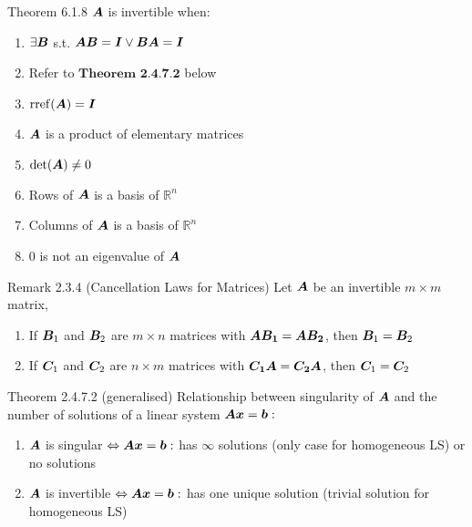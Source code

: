 \documentclass[10pt,portrait]{article}
\begin{document}
\begin{multicols}{2}
\begin{justifying}
\begin{namedthm*}{Theorem 6.1.8}
	\(\bm{A}\) is invertible when:
	\begin{enumerate}
		\item \(\exists \bm{B}\) s.t. \(\bm{AB} = \bm{I} \lor \bm{BA} = \bm{I}\)
		\item Refer to \(\textbf{Theorem 2.4.7.2}\) below
		\item \(\operatorname{rref}(\bm{A}) = \bm{I}\)
		\item \(\bm{A}\) is a product of elementary matrices
		\item \(\det(\bm{A}) \ne 0\)
		\item Rows of \(\bm{A}\) is a basis of \(\mathbb{R}^n\)
		\item Columns of \(\bm{A}\) is a basis of \(\mathbb{R}^n\)
		\item 0 is not an eigenvalue of \(\bm{A}\)
	\end{enumerate} 
\end{namedthm*}

\begin{namedthm*}{Remark 2.3.4 (Cancellation Laws for Matrices)}
	Let \(\bm{A}\) be an invertible \(m \times m\) matrix,
	\begin{enumerate}[label=(\alph*)]
		\item If \(\bm{B}_1\) and \(\bm{B}_2\) are \(m \times n\) matrices with \(\bm{AB_1} = \bm{AB_2}\), then \(\bm{B}_1 = \bm{B}_2\)
		\item If \(\bm{C}_1\) and \(\bm{C}_2\) are \(n \times m\) matrices with \(\bm{C_1A} = \bm{C_2A}\), then \(\bm{C}_1 = \bm{C}_2\)
	\end{enumerate}
\end{namedthm*}
\begin{namedthm*}{Theorem 2.4.7.2 (generalised)}
	Relationship between singularity of \(\bm{A}\) and the number of solutions of a linear system \(\bm{Ax} = \bm{b}:\)
	\begin{enumerate}
		\item \(\bm{A}\) is singular \(\Leftrightarrow \bm{Ax} = \bm{b}:\) has $\infty$ solutions (only case for homogeneous LS) or no solutions
		\item \(\bm{A}\) is invertible \(\Leftrightarrow \bm{Ax} = \bm{b}:\) has one unique solution (trivial solution for homogeneous LS)
	\end{enumerate} 
\end{namedthm*}


\end{justifying}
\end{multicols}
\end{document}
